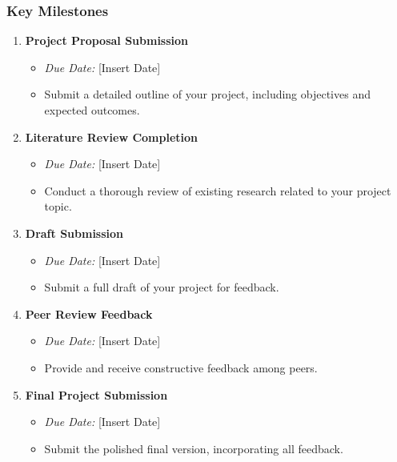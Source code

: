 \documentclass[aspectratio=169]{beamer}
\begin{document}
\begin{frame}[fragile]
    \frametitle{Key Milestones}
    \begin{enumerate}
        \item \textbf{Project Proposal Submission}
        \begin{itemize}
            \item \textit{Due Date:} [Insert Date]
            \item Submit a detailed outline of your project, including objectives and expected outcomes.
        \end{itemize}
        
        \item \textbf{Literature Review Completion}
        \begin{itemize}
            \item \textit{Due Date:} [Insert Date]
            \item Conduct a thorough review of existing research related to your project topic.
        \end{itemize}

        \item \textbf{Draft Submission}
        \begin{itemize}
            \item \textit{Due Date:} [Insert Date]
            \item Submit a full draft of your project for feedback.
        \end{itemize}
        
        \item \textbf{Peer Review Feedback}
        \begin{itemize}
            \item \textit{Due Date:} [Insert Date]
            \item Provide and receive constructive feedback among peers.
        \end{itemize}

        \item \textbf{Final Project Submission}
        \begin{itemize}
            \item \textit{Due Date:} [Insert Date]
            \item Submit the polished final version, incorporating all feedback.
        \end{itemize}
    \end{enumerate}
\end{frame}
\end{document}
